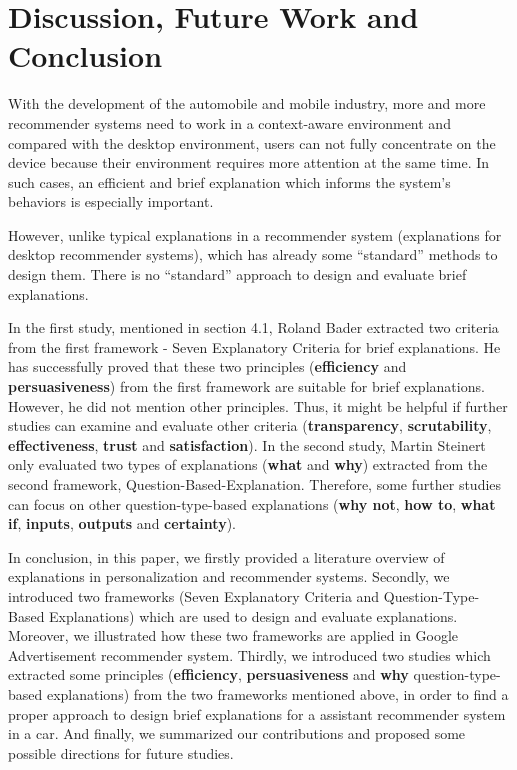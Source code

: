 \section{Discussion, Future Work and Conclusion}

    \indent With the development of the automobile and mobile industry, more and more recommender systems need to work in a context-aware environment and compared with the desktop environment, users can not fully concentrate on the device because their environment requires more attention at the same time. In such cases, an efficient and brief explanation which informs the system's behaviors is especially important.
    
    \indent However, unlike typical explanations in a recommender system (explanations for desktop recommender systems), which has already some ``standard'' methods to design them. There is no ``standard'' approach to design and evaluate brief explanations. 

    \indent In the first study, mentioned in section 4.1, Roland Bader extracted two criteria from the first framework - Seven Explanatory Criteria for brief explanations. He has successfully proved that these two principles (\textbf{efficiency} and \textbf{persuasiveness}) from the first framework are suitable for brief explanations. However, he did not mention other principles. Thus, it might be helpful if further studies can examine and evaluate other criteria (\textbf{transparency}, \textbf{scrutability}, \textbf{effectiveness}, \textbf{trust} and \textbf{satisfaction}). In the second study,  Martin Steinert only evaluated two types of explanations (\textbf{what} and \textbf{why}) extracted from the second framework, Question-Based-Explanation. Therefore, some further studies can focus on other question-type-based explanations (\textbf{why not}, \textbf{how to}, \textbf{what if}, \textbf{inputs}, \textbf{outputs} and \textbf{certainty}).

    \indent In conclusion, in this paper, we firstly provided a literature overview of explanations in personalization and recommender systems. Secondly, we introduced two frameworks (Seven Explanatory Criteria and Question-Type-Based Explanations) which are used to design and evaluate explanations. Moreover, we illustrated how these two frameworks are applied in Google Advertisement recommender system. Thirdly, we introduced two studies which extracted some principles (\textbf{efficiency}, \textbf{persuasiveness} and \textbf{why} question-type-based explanations) from the two frameworks mentioned above, in order to find a proper approach to design brief explanations for a assistant recommender system in a car. And finally, we summarized our contributions and proposed some possible directions for future studies.
